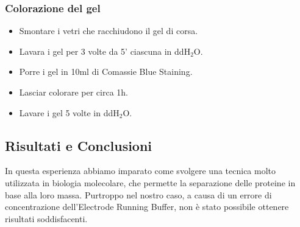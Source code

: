 



\subsubsection{Colorazione del gel}
\begin{itemize}
\item Smontare i vetri che racchiudono il gel di corsa.
\item Lavara i gel per 3 volte da 5' ciascuna in ddH$_2$O.
\item Porre i gel in 10ml di Comassie Blue Staining.
\item Lasciar colorare per circa 1h.
\item Lavare i gel 5 volte in ddH$_2$O.
\end{itemize}


\subsection{Risultati e Conclusioni}

In questa esperienza abbiamo imparato come svolgere una tecnica
molto utilizzata in biologia molecolare, che permette la separazione
delle proteine in base alla loro massa.
Purtroppo nel nostro caso, a causa di un errore di concentrazione
dell'Electrode Running Buffer, non \`e stato possibile ottenere
risultati soddisfacenti.
